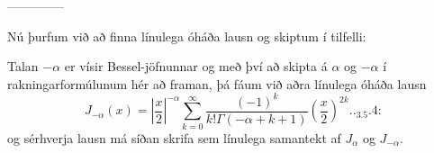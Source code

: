 --------------



\smallskip
Nú þurfum við að finna línulega óháða lausn og skiptum í tilfelli:

\smallskip
{}  Talan $-{\alpha}$ er vísir
Bessel-jöfnunnar og með því að skipta á ${\alpha}$ og $-{\alpha}$ í
rakningarformúlunum hér að framan, þá fáum við aðra línulega óháða lausn
 \begin{equation*}
J_{-\alpha}(x)=\left|\dfrac x2\right|^{-\alpha}\sum_{k=0}^\infty
\dfrac{(-1)^k}{k!\Gamma(-\alpha+k+1)}\left( \dfrac x2\right)^{2k}


.. _3.5.4:

 \end{equation*}
og sérhverja lausn má síðan skrifa sem línulega samantekt af 
$J_{\alpha}$ og $J_{-\alpha}$.

